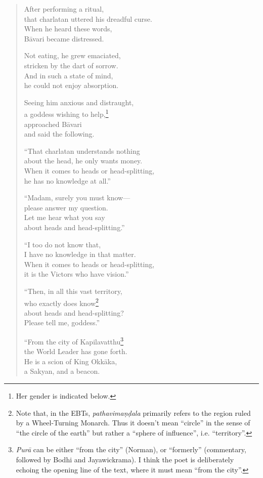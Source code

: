 \documentclass[12pt,openany]{book}%
\begin{document}
\begin{verse}
After performing a ritual, \\
that charlatan uttered his dreadful curse. \\
When he heard these words, \\
\textsanskrit{Bāvari} became distressed. 

Not eating, he grew emaciated, \\
stricken by the dart of sorrow. \\
And in such a state of mind, \\
he could not enjoy absorption. 

Seeing him anxious and distraught, \\
a goddess wishing to help,\footnote{Her gender is indicated below. } \\
approached \textsanskrit{Bāvari} \\
and said the following. 

“That charlatan understands nothing \\
about the head, he only wants money. \\
When it comes to heads or head-splitting, \\
he has no knowledge at all.” 

“Madam, surely you must know—\\
please answer my question. \\
Let me hear what you say \\
about heads and head-splitting.” 

“I too do not know that, \\
I have no knowledge in that matter. \\
When it comes to heads or head-splitting, \\
it is the Victors who have vision.” 

“Then, in all this vast territory, \\
who exactly does know\footnote{Note that, in the EBTs, \textit{\textsanskrit{pathavimaṇḍala}} primarily refers to the region ruled by a Wheel-Turning Monarch. Thus it doesn’t mean “circle” in the sense of “the circle of the earth” but rather a “sphere of influence”, i.e. “territory”. } \\
about heads and head-splitting? \\
Please tell me, goddess.” 

“From the city of Kapilavatthu\footnote{\textit{\textsanskrit{Purā}} can be either “from the city” (Norman), or “formerly” (commentary, followed by Bodhi and Jayawickrama). I think the poet is deliberately echoing the opening line of the text, where it must mean “from the city”. } \\
the World Leader has gone forth. \\
He is a scion of King \textsanskrit{Okkāka}, \\
a Sakyan, and a beacon. 


\end{verse}
\end{document}
